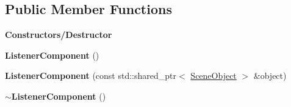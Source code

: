 \subsection*{Public Member Functions}
\begin{Indent}\textbf{ Constructors/\+Destructor}\par
\begin{DoxyCompactItemize}
\item 
\mbox{\label{classrev_1_1_listener_component_aa2e045a1fb76689e03f2b363820624f6}} 
{\bfseries Listener\+Component} ()
\item 
\mbox{\label{classrev_1_1_listener_component_a8852612ce156b39ae246a8fedc8cc091}} 
{\bfseries Listener\+Component} (const std\+::shared\+\_\+ptr$<$ \mbox{\hyperlink{classrev_1_1_scene_object}{Scene\+Object}} $>$ \&object)
\item 
\mbox{\label{classrev_1_1_listener_component_a74bdfcdb721c7ed531bebcaa63c997b5}} 
{\bfseries $\sim$\+Listener\+Component} ()
\end{DoxyCompactItemize}
\end{Indent}
